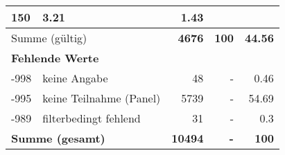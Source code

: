 \begin{longtable}{lXrrr}
       \num{150} &
       \num[round-mode=places,round-precision=2]{3,21} &
         \num[round-mode=places,round-precision=2]{1,43} \\
     \midrule
     \multicolumn{2}{l}{Summe (gültig)} &
       \textbf{\num{4676}} &
     \textbf{100} &
       \textbf{\num[round-mode=places,round-precision=2]{44,56}} \\
     \multicolumn{5}{l}{\textbf{Fehlende Werte}}\\
       -998 &
       keine Angabe &
         \num{48} &
        - &
         \num[round-mode=places,round-precision=2]{0,46} \\
       -995 &
       keine Teilnahme (Panel) &
         \num{5739} &
        - &
         \num[round-mode=places,round-precision=2]{54,69} \\
       -989 &
       filterbedingt fehlend &
         \num{31} &
        - &
         \num[round-mode=places,round-precision=2]{0,3} \\
     \midrule
     \multicolumn{2}{l}{\textbf{Summe (gesamt)}} &
          \textbf{\num{10494}} &
        \textbf{-} &
        \textbf{100} \\
     \bottomrule
     \end{longtable}
     
